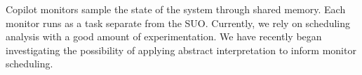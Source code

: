   Copilot monitors sample the state of the system through shared
  memory. Each monitor runs as a task separate from the SUO.
  Currently, we rely on scheduling analysis with a good amount of
  experimentation. We have recently began investigating the
  possibility of applying abstract interpretation to inform monitor
  scheduling.


 

  

